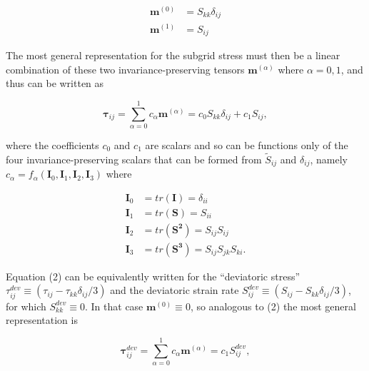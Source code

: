 %
\begin{subequations}
\begin{align}
	\label{E:18}
		\mathbf{m}^{(0)} &= S_{kk}\delta_{ij} \\
		\mathbf{m}^{(1)} &= S_{ij}
\end{align}
\end{subequations}
%
%        

The most general representation for the subgrid stress must then be a linear combination of these two invariance-preserving tensors $\mathbf{m}^{(\alpha)}$  where $\alpha = 0,1$, and thus can be written as 

%
\begin{equation}
	\label{E:19}
		\mathbf{\tau}_{ij} = \sum_{\alpha=0}^{1} c_{\alpha} \mathbf{m}^{(\alpha)}
		= c_0 S_{kk} \delta_{ij} + c_1 S_{ij},
\end{equation}
%
%        

where the coefficients $c_0$  and $c_1$  are scalars and so can be functions only of the four invariance-preserving scalars that can be formed from  $\widetilde{S}_{ij}$ and $\delta_{ij}$, namely  $c_{\alpha} = f_{\alpha} (\mathbf{I}_0, \mathbf{I}_1, \mathbf{I}_2,
\mathbf{I}_3)$ where 

%
\begin{subequations}
\begin{align}
	\label{E:20}
		\mathbf{I}_{0} &= tr(\mathbf{I})   = \delta_{ii} \\
		\mathbf{I}_{1} &= tr(\mathbf{S})   = S_{ii} \\
		\mathbf{I}_{2} &= tr(\mathbf{S^2}) = S_{ij}S_{ij} \\
		\mathbf{I}_{3} &= tr(\mathbf{S^3}) = S_{ij}S_{jk}S_{ki}. 
\end{align}
\end{subequations}
%
%    

Equation (2) can be equivalently written for the ``deviatoric stress''  $\tau_{ij}^{dev} \equiv (\tau_{ij} - \tau_{kk}\delta_{ij}/3)$ and the deviatoric strain rate  $S_{ij}^{dev} \equiv (S_{ij} - S_{kk}\delta_{ij}/3)$, for which $S_{kk}^{dev} \equiv 0$. In that case $\mathbf{m}^{(0)} \equiv 0$, so analogous to (2) the most general representation is

%
\begin{equation}
	\label{E:19}
		\mathbf{\tau}_{ij}^{dev} = \sum_{\alpha=0}^{1} c_{\alpha} \mathbf{m}^{(\alpha)}
		= c_1 S_{ij}^{dev},
\end{equation}
%
%     

